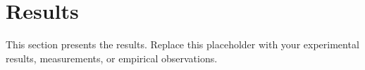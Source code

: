 
\section{Results}


This section presents the results. Replace this placeholder with your
experimental results, measurements, or empirical observations.
